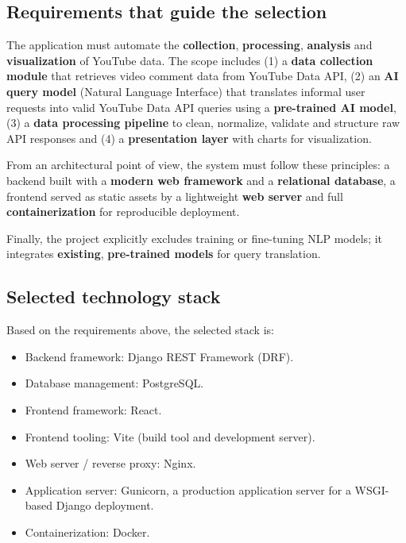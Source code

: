 \subsection{Requirements that guide the selection}

The application must automate the \textbf{collection}, \textbf{processing}, \textbf{analysis} and \textbf{visualization} of YouTube data. The scope includes (1) a \textbf{data collection module} that retrieves video comment data from YouTube Data API, (2) an \textbf{AI query model} (Natural Language Interface) that translates informal user requests into valid YouTube Data API queries using a \textbf{pre-trained AI model}, (3) a \textbf{data processing pipeline} to clean, normalize, validate and structure raw API responses and (4) a \textbf{presentation layer} with charts for visualization.

From an architectural point of view, the system must follow these principles: a backend built with a \textbf{modern web framework} and a \textbf{relational database}, a frontend served as static assets by a lightweight \textbf{web server} and full \textbf{containerization} for reproducible deployment.

Finally, the project explicitly excludes training or fine-tuning NLP models; it integrates \textbf{existing}, \textbf{pre-trained models} for query translation.

\subsection{Selected technology stack}

Based on the requirements above, the selected stack is:

\begin{itemize}
    \item Backend framework: Django REST Framework (DRF).

    \item Database management: PostgreSQL.

    \item Frontend framework: React.

    \item Frontend tooling: Vite (build tool and development server).

    \item Web server / reverse proxy: Nginx.

    \item Application server: Gunicorn, a production application server for a WSGI-based Django deployment.

    \item Containerization: Docker.
\end{itemize}

